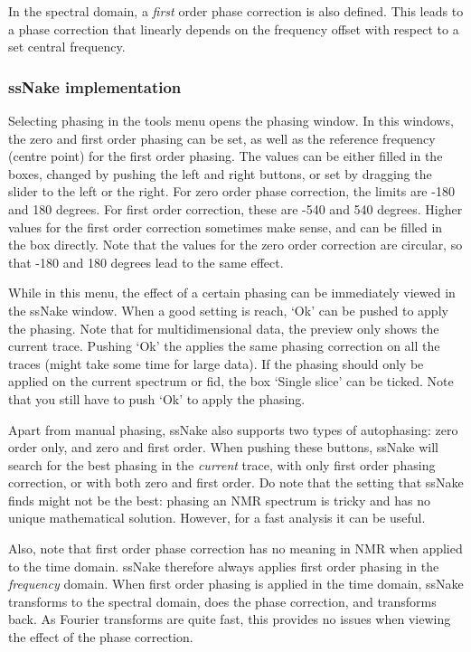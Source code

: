 \documentclass[11pt,a4paper]{article}
\begin{document}
In the spectral domain, a \textit{first} order phase correction is also defined. This leads to a phase correction that linearly depends on the frequency offset with respect to a set central frequency. 


\subsubsection*{ssNake implementation}
Selecting phasing in the tools menu opens the phasing window. In this windows, the zero and first order phasing can be set, as well as the reference frequency (centre point) for the first order phasing. The values can be either filled in the boxes,  changed by pushing the left and right buttons, or set by dragging the slider to the left or the right. For zero order phase correction, the limits are -180 and 180 degrees. For first order correction, these are -540 and 540 degrees. Higher values for the first order correction sometimes make sense, and can be filled in the box directly. Note that the values for the zero order correction are circular, so that -180 and 180 degrees lead to the same effect.

While in this menu, the effect of a certain phasing can be immediately viewed in the ssNake window. When a good setting is reach, `Ok' can be pushed to apply the phasing. Note that for multidimensional data, the preview only shows the current trace. Pushing `Ok' the applies the same phasing correction on all the traces (might take some time for large data). If the phasing should only be applied on the current spectrum or fid, the box `Single slice' can be ticked. Note that you still have to push `Ok' to apply the phasing.

Apart from manual phasing, ssNake also supports two types of autophasing: zero order only, and zero and first order. When pushing these buttons, ssNake will search for the best phasing in the \textit{current} trace, with only first order phasing correction, or with both zero and first order. Do note that the setting that ssNake finds might not be the best: phasing an NMR spectrum is tricky and has no unique mathematical solution. However, for a fast analysis it can be useful.

Also, note that first order phase correction has no meaning in NMR when applied to the time domain. ssNake therefore always applies first order phasing in the \textit{frequency} domain. When first order phasing is applied in the time domain, ssNake transforms to the spectral domain, does the phase correction, and transforms back. As Fourier transforms are quite fast, this provides no issues when viewing the effect of the phase correction.
\end{document}
